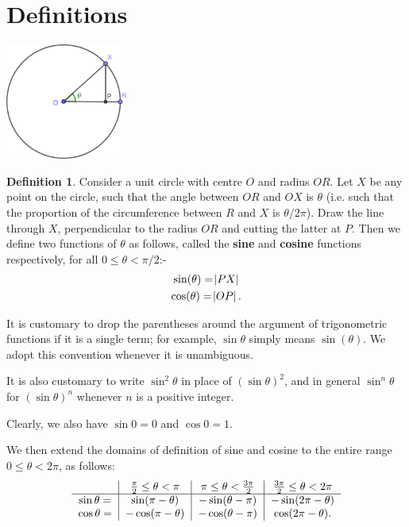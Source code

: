 \documentclass[a4paper,leqno]{article}
\numberwithin{equation}{section}
\theoremstyle{definition}
\newtheorem{defn}[equation]{Definition}
\theoremstyle{remark}
\newcommand{\df}[1]{\textbf{#1}}
\begin{document}
\section{Definitions}
\begin{center}
  \includegraphics[width=0.3\textwidth]{fndefinitions}
\end{center}

\begin{defn}\label{defn:trig1}
  Consider a unit circle with centre $ O $ and radius $ OR $. Let $ X $ be any point on the circle, such that the angle between $ OR $ and $ OX $
  is $ \theta $ (i.e. such that the proportion of the circumference between $ R $ and $ X $ is $ \theta/2\pi $). Draw the line through $ X $,
  perpendicular to the radius $ OR $ and cutting the latter at $ P $. Then we define two functions of $ \theta $ as follows, called the \df{sine} and \df{cosine}
  functions respectively, for all $ 0 \leq \theta < \pi/2 $:-
  \begin{gather}
    \sin(\theta) = \abs{PX}\\
    \cos(\theta) = \abs{OP}.
  \end{gather}
\end{defn}

It is customary to drop the parentheses around the argument of trigonometric functions if it is a single term; for
example, $ \sin \theta $ simply means $ \sin(\theta) $. We adopt this convention whenever it is unambiguous.

It is also customary to write $ \sin^2 \theta $ in place of $ (\sin \theta)^2 $, and in general $ \sin^n \theta $
for $ (\sin \theta)^n $ whenever $ n $ is a positive integer.

Clearly, we also have $ \sin 0 = 0 $ and $ \cos 0 = 1 $.

We then extend the domains of definition of sine and cosine to the entire range $ 0 \leq \theta < 2\pi $, as follows:
\begin{equation}\label{tab:extend1}
\begin{tabular}{c|c|c|c}
  & $ \frac{\pi}{2} \leq \theta < \pi $ & $ \pi \leq \theta < \frac{3\pi}{2} $ & $ \frac{3\pi}{2} \leq \theta < 2\pi $\\\hline
  $ \sin \theta = $ & $ \sin(\pi - \theta) $ & $ -\sin(\theta - \pi)$ & $-\sin(2\pi - \theta) $\\
  $ \cos \theta = $ & $ -\cos(\pi - \theta) $ & $ - \cos (\theta - \pi) $ & $ \cos(2\pi - \theta) $.
\end{tabular}
\end{equation}
\end{document}

